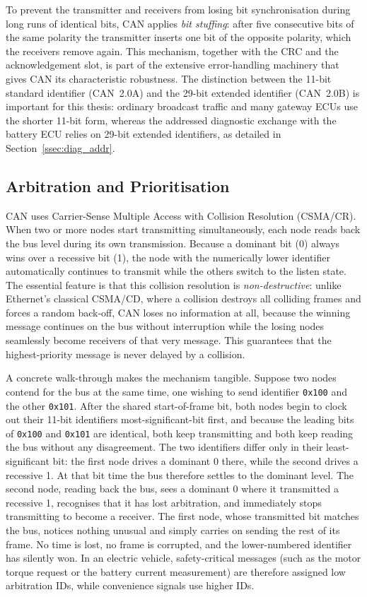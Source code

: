 \documentclass[11pt,a4paper,oneside,parskip=half]{scrreprt}
\newcommand{\canid}[1]{\texttt{0x#1}}
\providecommand{\hex}{}\renewcommand{\hex}[1]{\texttt{0x#1}}
\begin{document}
To prevent the transmitter and receivers from losing bit synchronisation during long runs of identical bits, CAN applies \textit{bit stuffing}: after five consecutive bits of the same polarity the transmitter inserts one bit of the opposite polarity, which the receivers remove again. This mechanism, together with the CRC and the acknowledgement slot, is part of the extensive error-handling machinery that gives CAN its characteristic robustness. The distinction between the 11-bit standard identifier (CAN~2.0A) and the 29-bit extended identifier (CAN~2.0B) is important for this thesis: ordinary broadcast traffic and many gateway ECUs use the shorter 11-bit form, whereas the addressed diagnostic exchange with the battery ECU relies on 29-bit extended identifiers, as detailed in Section~\ref{ssec:diag_addr}.

\subsection{Arbitration and Prioritisation}
CAN uses Carrier-Sense Multiple Access with Collision Resolution (CSMA/CR). When two or more nodes start transmitting simultaneously, each node reads back the bus level during its own transmission. Because a dominant bit (0) always wins over a recessive bit (1), the node with the numerically lower identifier automatically continues to transmit while the others switch to the listen state. The essential feature is that this collision resolution is \emph{non-destructive}: unlike Ethernet's classical CSMA/CD, where a collision destroys all colliding frames and forces a random back-off, CAN loses no information at all, because the winning message continues on the bus without interruption while the losing nodes seamlessly become receivers of that very message. This guarantees that the highest-priority message is never delayed by a collision.

A concrete walk-through makes the mechanism tangible. Suppose two nodes contend for the bus at the same time, one wishing to send identifier \canid{100} and the other \canid{101}. After the shared start-of-frame bit, both nodes begin to clock out their 11-bit identifiers most-significant-bit first, and because the leading bits of \hex{100} and \hex{101} are identical, both keep transmitting and both keep reading the bus without any disagreement. The two identifiers differ only in their least-significant bit: the first node drives a dominant 0 there, while the second drives a recessive 1. At that bit time the bus therefore settles to the dominant level. The second node, reading back the bus, sees a dominant 0 where it transmitted a recessive 1, recognises that it has lost arbitration, and immediately stops transmitting to become a receiver. The first node, whose transmitted bit matches the bus, notices nothing unusual and simply carries on sending the rest of its frame. No time is lost, no frame is corrupted, and the lower-numbered identifier has silently won. In an electric vehicle, safety-critical messages (such as the motor torque request or the battery current measurement) are therefore assigned low arbitration IDs, while convenience signals use higher IDs.
\end{document}
